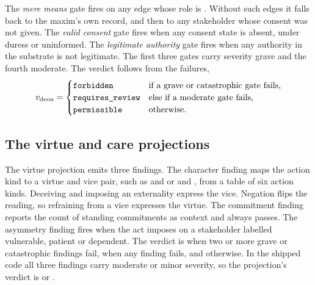 The \emph{mere means} gate fires on any  edge whose role is .
Without such edges it falls back to the maxim's own record, and then to any stakeholder whose
consent was not given. The \emph{valid consent} gate fires when any consent state is absent,
under duress or uninformed. The \emph{legitimate authority} gate fires when any authority in the
substrate is not legitimate. The first three gates carry severity grave and the fourth moderate.
The verdict follows from the failures,
\begin{equation}
v_{\mathrm{deon}} =
\begin{cases}
\texttt{forbidden} & \text{if a grave or catastrophic gate fails,}\\
\texttt{requires\_review} & \text{else if a moderate gate fails,}\\
\texttt{permissible} & \text{otherwise.}
\end{cases}
\label{eq:compiler-deontic}
\end{equation}

\subsection{The virtue and care projections}

The virtue projection emits three findings. The character finding maps the action kind to a
virtue and vice pair, such as  and  or  and , from a table of six
action kinds. Deceiving and imposing an externality express the vice. Negation flips the reading,
so refraining from a vice expresses the virtue. The commitment finding reports the count of
standing commitments as context and always passes. The asymmetry finding fires when the act
imposes on a stakeholder labelled vulnerable, patient or dependent. The verdict is 
when two or more grave or catastrophic findings fail,  when any
finding fails, and  otherwise. In the shipped code all three findings carry
moderate or minor severity, so the projection's verdict is  or
.

